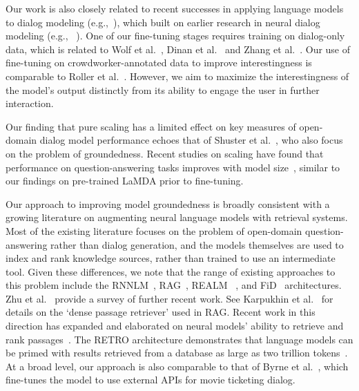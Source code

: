 Our work is also closely related to recent successes in applying language models to dialog modeling (e.g.,~\cite{dinan2020,zhang2018,adiwardana2020humanlike,blenderbot}), which built on earlier research in neural dialog modeling (e.g., ~\cite{shang-etal-2015-neural,sordoni2015neural,NCM,li2015diversity,serban2016}). One of our fine-tuning stages requires training on dialog-only data, which is related to Wolf et al.~\cite{wolf}, Dinan et al.~\cite{dinan2020} and Zhang et al.~\cite{zhang2019dialogpt}. Our use of fine-tuning on crowdworker-annotated data to improve interestingness is comparable to Roller et al.~\cite{blenderbot}. However, we aim to maximize the interestingness of the model’s output distinctly from its ability to engage the user in further interaction. 

Our finding that pure scaling has a limited effect on key measures of open-domain dialog model performance echoes that of Shuster et al.~\cite{shuster2021retrieval}, who also focus on the problem of groundedness. Recent studies on scaling have found that performance on question-answering tasks improves with model size~\cite{roberts2020knowledge,du2021glam}, similar to our findings on pre-trained LaMDA prior to fine-tuning.

Our approach to improving model groundedness is broadly consistent with a growing literature on augmenting neural language models with retrieval systems. Most of the existing literature focuses on the problem of open-domain question-answering rather than dialog generation, and the models themselves are used to index and rank knowledge sources, rather than trained to use an intermediate tool. Given these differences, we note that the range of existing approaches to this problem include the RNNLM~\cite{khandelwal2019generalization}, RAG~\cite{lewis2021retrieval}, REALM~ \cite{guu2020realm}, and FiD~\cite{izacard2021leveraging} architectures. Zhu et al.~\cite{zhu2021retrieving} provide a survey of further recent work. See Karpukhin et al.~\cite{karpukhin2020dense} for details on the ‘dense passage retriever’ used in RAG. Recent work in this direction has expanded and elaborated on neural models’ ability to retrieve and rank passages~\cite{lesota2021modern}. The RETRO architecture demonstrates that language models can be primed with results retrieved from a database as large as two trillion tokens~\cite{borgeaud2021improving}. At a broad level, our approach is also comparable to that of Byrne et al.~\cite{tickettalk}, which fine-tunes the model to use external APIs for movie ticketing dialog.

